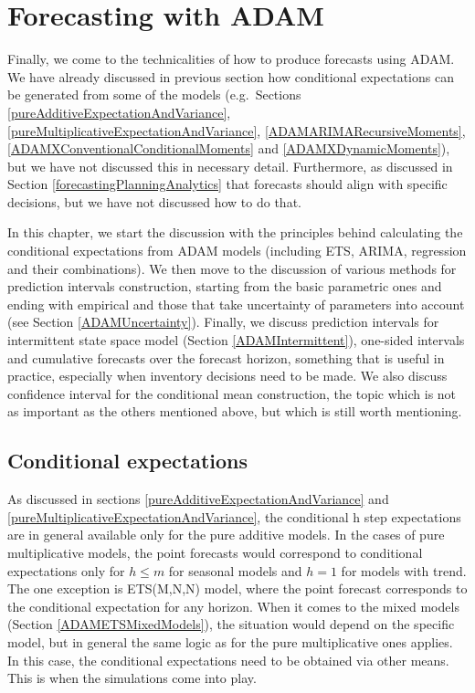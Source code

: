 \documentclass[
]{book}
\theoremstyle{definition}
\theoremstyle{definition}
\theoremstyle{definition}
\theoremstyle{definition}
\theoremstyle{remark}
\begin{document}
\hypertarget{ADAMForecasting}{%
\chapter{Forecasting with ADAM}\label{ADAMForecasting}}

Finally, we come to the technicalities of how to produce forecasts using ADAM. We have already discussed in previous section how conditional expectations can be generated from some of the models (e.g.~Sections \ref{pureAdditiveExpectationAndVariance}, \ref{pureMultiplicativeExpectationAndVariance}, \ref{ADAMARIMARecursiveMoments}, \ref{ADAMXConventionalConditionalMoments} and \ref{ADAMXDynamicMoments}), but we have not discussed this in necessary detail. Furthermore, as discussed in Section \ref{forecastingPlanningAnalytics} that forecasts should align with specific decisions, but we have not discussed how to do that.

In this chapter, we start the discussion with the principles behind calculating the conditional expectations from ADAM models (including ETS, ARIMA, regression and their combinations). We then move to the discussion of various methods for prediction intervals construction, starting from the basic parametric ones and ending with empirical and those that take uncertainty of parameters into account (see Section \ref{ADAMUncertainty}). Finally, we discuss prediction intervals for intermittent state space model (Section \ref{ADAMIntermittent}), one-sided intervals and cumulative forecasts over the forecast horizon, something that is useful in practice, especially when inventory decisions need to be made. We also discuss confidence interval for the conditional mean construction, the topic which is not as important as the others mentioned above, but which is still worth mentioning.

\hypertarget{ADAMForecastingExpectation}{%
\section{Conditional expectations}\label{ADAMForecastingExpectation}}

As discussed in sections \ref{pureAdditiveExpectationAndVariance} and \ref{pureMultiplicativeExpectationAndVariance}, the conditional h step expectations are in general available only for the pure additive models. In the cases of pure multiplicative models, the point forecasts would correspond to conditional expectations only for \(h \leq m\) for seasonal models and \(h=1\) for models with trend. The one exception is ETS(M,N,N) model, where the point forecast corresponds to the conditional expectation for any horizon. When it comes to the mixed models (Section \ref{ADAMETSMixedModels}), the situation would depend on the specific model, but in general the same logic as for the pure multiplicative ones applies. In this case, the conditional expectations need to be obtained via other means. This is when the simulations come into play.
\end{document}
